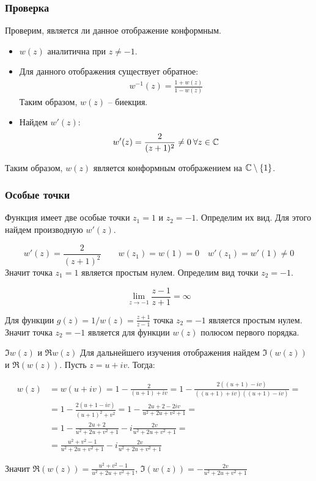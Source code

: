 \begin{frame}\frametitle{Проверка}
Проверим, является ли данное отображение конформным.

\begin{itemize}
\item
\(w(z)\) аналитична при \(z \neq -1\).

\item
Для данного отображения существует обратное:
\begin{align*}
	w^{-1}(z) = \frac{1+w(z)}{1 - w(z)}
\end{align*}
Таким образом, \(w(z)\) -- биекция.

\item Найдем \(w'(z)\):
\begin{align*}
	w'(z) = \frac{2}{(z+1)^2} \neq 0 \: \forall z \in \mathbb{C}
\end{align*}
\end{itemize}

Таким образом, \(w(z)\) является конформным отображением
на \(\mathbb{C} \setminus \{1\}\).
\end{frame}

\begin{frame}\frametitle{Особые точки}
	Функция имеет две особые точки \(z_1 = 1\) и \(z_2 = -1\).
	Определим их вид.
	Для этого найдем производную \(w'(z)\).

	\[
		w'(z) = \frac{2}{(z+1)^2}
		\qquad
		w(z_1) = w(1) = 0
		\quad
		w'(z_1) = w'(1) \neq 0
	\]
	Значит точка \(z_1 = 1\) является простым нулем.
	Определим вид точки \(z_2 = -1\).

	\[ \lim_{z \to -1} \frac{z-1}{z+1} = \infty \]

	Для функции \(g(z) = 1/w(z) = \frac{z+1}{z-1}\)
	точка \(z_2 = -1\) является простым нулем.
	Значит точка \(z_2 = -1\) является для функции \(w(z)\) полюсом первого порядка.

\end{frame}

\begin{frame}{\(\Im w(z)\) и \(\Re w(z)\)}
  Для дальнейшего изучения отображения найдем \( \Im(w(z)) \) и \( \Re(w(z)) \).
  Пусть \( z = u + i v \). Тогда:

  \begin{align*}
    w(z) &= w(u + iv) = 1 - \frac{2}{(u + 1) + iv} = 1 - \frac{2((u + 1) - iv)}{((u+1)+iv)((u+1)-iv)} = \\
    &= 1 - \frac{2(u + 1 - iv)}{(u+1)^2 + v^2} = 1 - \frac{2u + 2 - 2iv}{u^2 + 2u + v^2 + 1} = \\
    &= 1 - \frac{2u+2}{u^2+2u+v^2+1} - i\frac{2v}{u^2+2u+v^2+1} = \\
    &= \frac{u^2 +v^2 - 1}{u^2+2u+v^2+1} - i \frac{2v}{u^2+2u+v^2+1}
  \end{align*}

  Значит \( \Re(w(z)) = \frac{u^2+v^2-1}{u^2+2u+v^2+1} \), \( \Im(w(z)) = - \frac{2v}{u^2+2u+v^2+1} \)
\end{frame}
